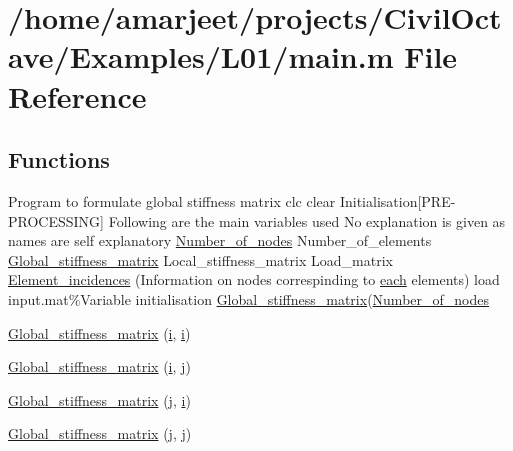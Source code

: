 \hypertarget{a00007}{}\section{/home/amarjeet/projects/\+Civil\+Octave/\+Examples/\+L01/main.m File Reference}
\label{a00007}
\subsection*{Functions}
\begin{DoxyCompactItemize}
\item 
Program to formulate global stiffness matrix clc clear Initialisation\mbox{[}P\+R\+E-\/P\+R\+O\+C\+E\+S\+S\+I\+N\+G\mbox{]} Following are the main variables used No explanation is given as names are self explanatory \hyperlink{a00007_a1d65c23ed4744bf98747671b08490b5c}{Number\+\_\+of\+\_\+nodes} Number\+\_\+of\+\_\+elements \hyperlink{a00008_a9476fe4c830b643fa299df9ac0058700}{Global\+\_\+stiffness\+\_\+matrix} Local\+\_\+stiffness\+\_\+matrix Load\+\_\+matrix \hyperlink{a00007_aba5eae545abb25c91b167b9fcdf95479}{Element\+\_\+incidences} (Information on nodes correspinding to \hyperlink{a00030_a18d9b499a0765bf2fe5f372ff2fc0236}{each} elements) load input.\+mat\%Variable initialisation \hyperlink{a00008_a9476fe4c830b643fa299df9ac0058700}{Global\+\_\+stiffness\+\_\+matrix}(\hyperlink{a00007_a1d65c23ed4744bf98747671b08490b5c}{Number\+\_\+of\+\_\+nodes}
\item 
\hyperlink{a00007_ac49be6f89ac077f02ba11ae139998e18}{Global\+\_\+stiffness\+\_\+matrix} (\hyperlink{a00008_a6dbbc96f4222af2f6c18c8e60f41726b}{i}, \hyperlink{a00008_a6dbbc96f4222af2f6c18c8e60f41726b}{i})
\item 
\hyperlink{a00007_a5ca92e4751e2463890d3890c093f2f66}{Global\+\_\+stiffness\+\_\+matrix} (\hyperlink{a00008_a6dbbc96f4222af2f6c18c8e60f41726b}{i}, \hyperlink{a00008_ac86694252f8dfdb19aaeadc4b7c342c6}{j})
\item 
\hyperlink{a00007_a2b00ddbc1d7ea36c65d01af022cfa084}{Global\+\_\+stiffness\+\_\+matrix} (\hyperlink{a00008_ac86694252f8dfdb19aaeadc4b7c342c6}{j}, \hyperlink{a00008_a6dbbc96f4222af2f6c18c8e60f41726b}{i})
\item 
\hyperlink{a00007_ad86393496bbb30126f51c1036b452f34}{Global\+\_\+stiffness\+\_\+matrix} (\hyperlink{a00008_ac86694252f8dfdb19aaeadc4b7c342c6}{j}, \hyperlink{a00008_ac86694252f8dfdb19aaeadc4b7c342c6}{j})
\end{DoxyCompactItemize}
